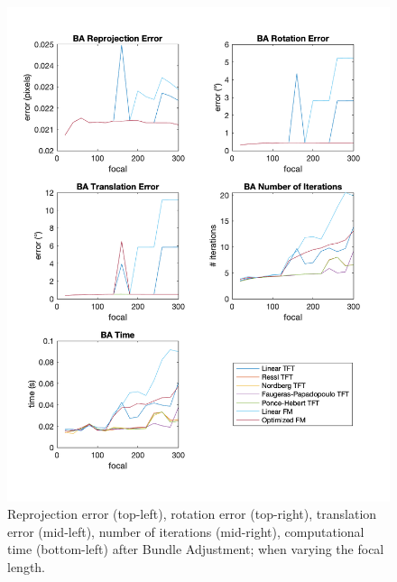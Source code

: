 \begin{figure}[p]
	\centering
	\includegraphics[width=1\textwidth]{Experiments/Synthetic/focal/BAfocalPlots.png}
	\caption{Reprojection error (top-left), rotation error (top-right), translation error (mid-left), number of iterations (mid-right), computational time (bottom-left) after Bundle Adjustment; when varying the focal length.}
	\label{fig:BAFocalPlot}
\end{figure}

